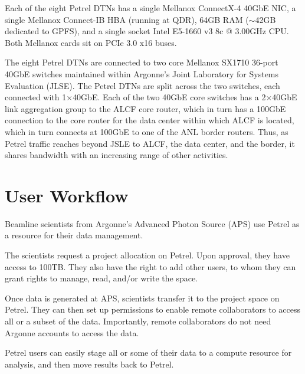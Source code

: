 \documentclass[sigconf]{acmart}
\begin{document}
Each of the eight Petrel DTNs has a single Mellanox ConnectX-4 40GbE NIC, a single Mellanox Connect-IB HBA (running at QDR), 64GB RAM ($\sim$42GB dedicated to GPFS), and a single socket Intel E5-1660 v3 8c @ 3.00GHz CPU. 
Both Mellanox cards sit on PCIe 3.0 x16 buses.

The eight Petrel DTNs are connected to two core Mellanox SX1710 36-port 40GbE switches
maintained within Argonne's Joint Laboratory for Systems Evaluation (JLSE).
The Petrel DTNs are split across the two switches, each connected with 1$\times$40GbE. 
Each of the two 40GbE core switches has a 2$\times$40GbE link aggregation group to the ALCF core router, which in turn has a 100GbE connection to the core router for the data center within
which ALCF is located,
which in turn connects at 100GbE to one of the ANL border routers.
Thus, as Petrel traffic reaches beyond JSLE to ALCF, the data center, and the border,
it shares bandwidth with an increasing range of other activities.






\section{User Workflow}


Beamline scientists from Argonne's Advanced Photon Source (APS) use Petrel as a resource for their data management.

The scientists request a project allocation on Petrel. 
Upon approval, they have access to 100TB. 
They also have the right to add other users, to whom they can grant rights to manage, read, and/or write the space.

Once data is generated at APS, scientists transfer it to the project space on Petrel. 
They can then set up permissions to enable remote collaborators to access all or a subset of the data. 
Importantly, remote collaborators do not need Argonne accounts to access the data.

Petrel users can easily stage all or some of their data to a compute resource for analysis, and then move results back to Petrel.
\end{document}
